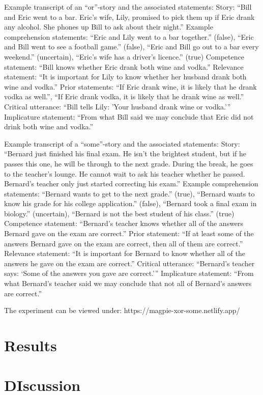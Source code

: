 \documentclass{sp}
\begin{document}
Example transcript of an “or”-story and the associated statements:
Story: “Bill and Eric went to a bar. Eric’s wife, Lily, promised to pick them up if Eric drank any alcohol. She phones up Bill to ask about their night.”
Example comprehension statements: “Eric and Lily went to a bar together.” (false), “Eric and Bill went to see a football game.” (false), “Eric and Bill go out to a bar every weekend.” (uncertain), “Eric's wife has a driver’s licence.” (true)
Competence statement: “Bill knows whether Eric drank both wine and vodka.”
Relevance statement: “It is important for Lily to know whether her husband drank both wine and vodka.”
Prior statements: “If Eric drank wine, it is likely that he drank vodka as well.”, “If Eric drank vodka, it is likely that he drank wine as well.”
Critical utterance: “Bill tells Lily: 'Your husband drank wine or vodka.'”
Implicature statement: “From what Bill said we may conclude that Eric did not drink both wine and vodka.”

Example transcript of a “some”-story and the associated statements:
Story: “Bernard just finished his final exam. He isn't the brightest student, but if he passes this one, he will be through to the next grade. During the break, he goes to the teacher's lounge. He cannot wait to ask his teacher whether he passed. Bernard's teacher only just started correcting his exam.”
Example comprehension statements: “Bernard wants to get to the next grade.” (true), “Bernard wants to know his grade for his college application.” (false), “Bernard took a final exam in biology.” (uncertain), “Bernard is not the best student of his class.” (true)
Competence statement: “Bernard’s teacher knows whether all of the answers Bernard gave on the exam are correct.”
Prior statement: “If at least some of the answers Bernard gave on the exam are correct, then all of them are correct.”
Relevance statement: “It is important for Bernard to know whether all of the answers he gave on the exam are correct.”
Critical utterance: “Bernard’s teacher says: ‘Some of the answers you gave are correct.’”
Implicature statement: “From what Bernard’s teacher said we may conclude that not all of Bernard’s answers are correct.”

The experiment can be viewed under: https://magpie-xor-some.netlify.app/

\section{Results}

\section{DIscussion}
\end{document}
